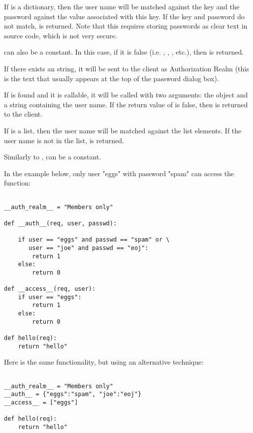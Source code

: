 If  is a dictionary, then the user name will be
matched against the key and the password against the value associated
with this key. If the key and password do not match, 
 is returned. Note that this requires
storing passwords as clear text in source code, which is not very secure.

 can also be a constant. In this case, if it is false
(i.e. , , , etc.), then 
 is returned.

If there exists an  string, it will be sent
to the client as Authorization Realm (this is the text that usually
appears at the top of the password dialog box).

If  is found and it is callable, it will be called
with two arguments: the  object and a string containing
the user name. If the return value of  is false, then
 is returned to the client.

If  is a list, then the user name will be matched
against the list elements. If the user name is not in the list, 
 is returned.

Similarly to ,  can be a constant.

In the example below, only user "eggs" with password "spam" can access
the  function:

\begin{verbatim}

__auth_realm__ = "Members only"

def __auth__(req, user, passwd):

    if user == "eggs" and passwd == "spam" or \
       user == "joe" and passwd == "eoj":
        return 1
    else:
        return 0

def __access__(req, user):
    if user == "eggs":
        return 1
    else:
        return 0

def hello(req):
    return "hello"

\end{verbatim}

Here is the same functionality, but using an alternative technique:

\begin{verbatim}

__auth_realm__ = "Members only"
__auth__ = {"eggs":"spam", "joe":"eoj"}
__access__ = ["eggs"]

def hello(req):
    return "hello"

\end{verbatim}

